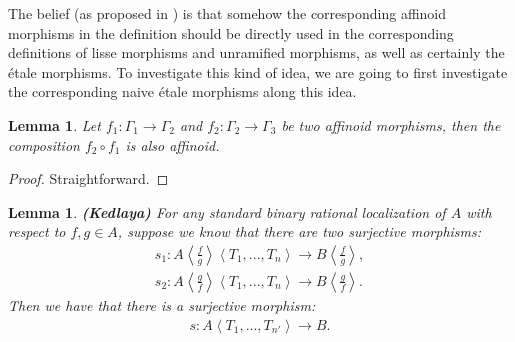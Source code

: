 \documentclass[12pt]{amsart}
\newtheorem{lemma}[theorem]{Lemma}
\theoremstyle{definition}
\numberwithin{equation}{section}
\begin{document}
\indent The belief (as proposed in \cite[Problem A5.3, Problem A5.4]{Ked1}) is that somehow the corresponding affinoid morphisms in the definition should be directly used in the corresponding definitions of lisse morphisms and unramified morphisms, as well as certainly the \'etale morphisms. To investigate this kind of idea, we are going to first investigate the corresponding naive \'etale morphisms along this idea.\\



\begin{lemma}
Let $f_1:\Gamma_1\rightarrow \Gamma_2$ and $f_2:\Gamma_2\rightarrow \Gamma_3$ be two affinoid morphisms, then the composition $f_2\circ f_1$ is also affinoid.	
\end{lemma}


\begin{proof}
Straightforward.	
\end{proof}




\begin{lemma}\mbox{\bf{(Kedlaya)}} \label{lemma2.5}
For any standard binary rational localization of $A$ with respect to $f,g\in A$, suppose we know that there are two surjective morphisms:
\begin{align}
s_1:A\left<\frac{f}{g}\right>\left<T_1,...,T_n\right>\rightarrow B\left<\frac{f}{g}\right>,\\
s_2:A\left<\frac{g}{f}\right>\left<T_1,...,T_{n}\right>\rightarrow B\left<\frac{g}{f}\right>.	
\end{align}
Then we have that there is a surjective morphism:
\begin{align}
s:A\left<T_1,...,T_{n'}\right>\rightarrow B.
\end{align}	
\end{lemma}
\end{document}
